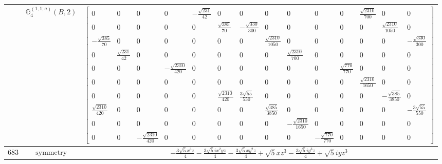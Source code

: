 \documentclass[fleqn,8pt,landscape]{jsarticle}
\begin{document}
\begin{longtable}{ccc}
$  $ & $ \mathbb{G}_{4}^{(1,1;a)}(B,2) $ & $ \begin{bmatrix} 0 & 0 & 0 & 0 & - \frac{\sqrt{231}}{42} & 0 & 0 & 0 & 0 & 0 & 0 & \frac{\sqrt{2310}}{700} & 0 & 0 \\ 0 & 0 & 0 & 0 & 0 & \frac{\sqrt{385}}{70} & - \frac{\sqrt{330}}{300} & 0 & 0 & 0 & 0 & 0 & \frac{\sqrt{2310}}{1050} & 0 \\ - \frac{\sqrt{385}}{70} & 0 & 0 & 0 & 0 & 0 & 0 & \frac{\sqrt{2310}}{1050} & 0 & 0 & 0 & 0 & 0 & - \frac{\sqrt{330}}{300} \\ 0 & \frac{\sqrt{231}}{42} & 0 & 0 & 0 & 0 & 0 & 0 & \frac{\sqrt{2310}}{700} & 0 & 0 & 0 & 0 & 0 \\ 0 & 0 & 0 & - \frac{\sqrt{2310}}{420} & 0 & 0 & 0 & 0 & 0 & 0 & \frac{\sqrt{770}}{770} & 0 & 0 & 0 \\ 0 & 0 & 0 & 0 & 0 & 0 & 0 & 0 & 0 & 0 & 0 & \frac{\sqrt{2310}}{1650} & 0 & 0 \\ 0 & 0 & 0 & 0 & 0 & \frac{\sqrt{2310}}{420} & \frac{3 \sqrt{55}}{550} & 0 & 0 & 0 & 0 & 0 & - \frac{\sqrt{385}}{3850} & 0 \\ \frac{\sqrt{2310}}{420} & 0 & 0 & 0 & 0 & 0 & 0 & \frac{\sqrt{385}}{3850} & 0 & 0 & 0 & 0 & 0 & - \frac{3 \sqrt{55}}{550} \\ 0 & 0 & 0 & 0 & 0 & 0 & 0 & 0 & - \frac{\sqrt{2310}}{1650} & 0 & 0 & 0 & 0 & 0 \\ 0 & 0 & - \frac{\sqrt{2310}}{420} & 0 & 0 & 0 & 0 & 0 & 0 & - \frac{\sqrt{770}}{770} & 0 & 0 & 0 & 0 \end{bmatrix} $ \\ \hline
$ 683 $ & $ \text{symmetry} $ & $ - \frac{3 \sqrt{5} x^{3} z}{4} - \frac{3 \sqrt{5} i x^{2} y z}{4} - \frac{3 \sqrt{5} x y^{2} z}{4} + \sqrt{5} x z^{3} - \frac{3 \sqrt{5} i y^{3} z}{4} + \sqrt{5} i y z^{3} $ \\

\end{longtable}
\end{document}
